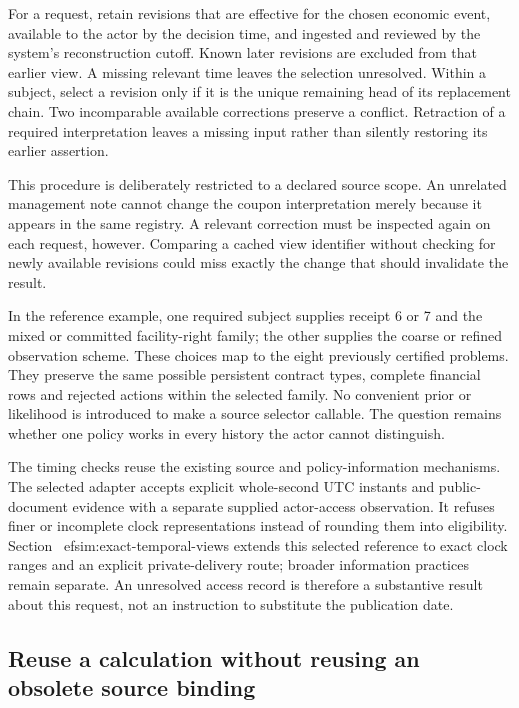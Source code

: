 For a request, retain revisions that are effective for the chosen economic event, available to the actor by the decision time, and ingested and reviewed by the system's reconstruction cutoff. Known later revisions are excluded from that earlier view. A missing relevant time leaves the selection unresolved. Within a subject, select a revision only if it is the unique remaining head of its replacement chain. Two incomparable available corrections preserve a conflict. Retraction of a required interpretation leaves a missing input rather than silently restoring its earlier assertion.

This procedure is deliberately restricted to a declared source scope. An unrelated management note cannot change the coupon interpretation merely because it appears in the same registry. A relevant correction must be inspected again on each request, however. Comparing a cached view identifier without checking for newly available revisions could miss exactly the change that should invalidate the result.

In the reference example, one required subject supplies receipt 6 or 7 and the mixed or committed facility-right family; the other supplies the coarse or refined observation scheme. These choices map to the eight previously certified problems. They preserve the same possible persistent contract types, complete financial rows and rejected actions within the selected family. No convenient prior or likelihood is introduced to make a source selector callable. The question remains whether one policy works in every history the actor cannot distinguish.

The timing checks reuse the existing source and policy-information mechanisms. The selected adapter accepts explicit whole-second UTC instants and public-document evidence with a separate supplied actor-access observation. It refuses finer or incomplete clock representations instead of rounding them into eligibility. Section~
ef{sim:exact-temporal-views} extends this selected reference to exact clock ranges and an explicit private-delivery route; broader information practices remain separate. An unresolved access record is therefore a substantive result about this request, not an instruction to substitute the publication date.

\subsection{Reuse a calculation without reusing an obsolete source binding}

